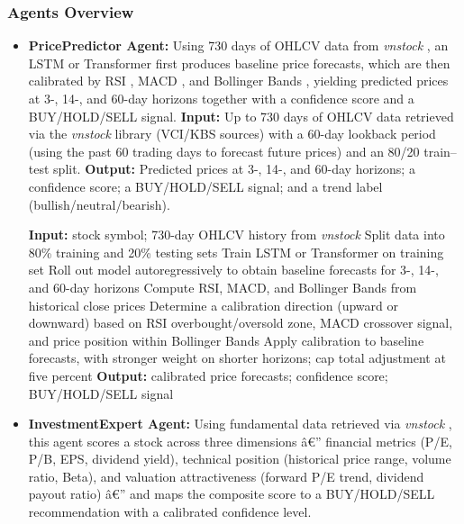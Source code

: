 \documentclass{ieeeaccess}
\begin{document}
\subsubsection{Agents Overview}
\begin{itemize}
    \item \textbf{PricePredictor Agent:}
    Using 730 days of OHLCV data from \textit{vnstock} \cite{vnstock2023}, an LSTM \cite{hochreiter1997long}
    or Transformer \cite{vaswani2017attention} first produces baseline price forecasts, which are then
    calibrated by RSI \cite{wilder1978new}, MACD \cite{appel2005technical}, and Bollinger Bands
    \cite{bollinger2002bollinger}, yielding predicted prices
    at 3-, 14-, and 60-day horizons together with a confidence score and a BUY/HOLD/SELL signal.
    \textbf{Input:} Up to 730 days of OHLCV data retrieved via the \textit{vnstock} library \cite{vnstock2023} (VCI/KBS sources) with a 60-day lookback period (using the past 60 trading days to forecast future prices) and an 80/20 train--test split.
    \textbf{Output:} Predicted prices at 3-, 14-, and 60-day horizons; a confidence score; a BUY/HOLD/SELL signal; and a trend label (bullish/neutral/bearish).

    \begin{algorithmic}[1]
    \STATE \textbf{Input:} stock symbol; 730-day OHLCV history from \textit{vnstock}
    \STATE Split data into 80\% training and 20\% testing sets
    \STATE Train LSTM or Transformer on training set
    \STATE Roll out model autoregressively to obtain baseline forecasts for 3-, 14-, and 60-day horizons
    \STATE Compute RSI, MACD, and Bollinger Bands from historical close prices
    \STATE Determine a calibration direction (upward or downward) based on RSI overbought/oversold zone, MACD crossover signal, and price position within Bollinger Bands
    \STATE Apply calibration to baseline forecasts, with stronger weight on shorter horizons; cap total adjustment at five percent
    \STATE \textbf{Output:} calibrated price forecasts; confidence score; BUY/HOLD/SELL signal
    \end{algorithmic}

    \item \textbf{InvestmentExpert Agent:}
    Using fundamental data retrieved via \textit{vnstock} \cite{vnstock2023}, this agent scores
    a stock across three dimensions â€” financial metrics (P/E, P/B, EPS, dividend yield),
    technical position (historical price range, volume ratio, Beta), and valuation
    attractiveness (forward P/E trend, dividend payout ratio) â€” and maps the
    composite score to a BUY/HOLD/SELL recommendation with a calibrated confidence level.


\end{itemize}
\end{document}
